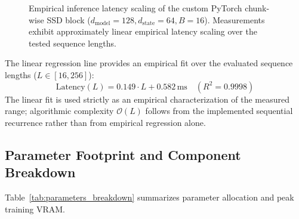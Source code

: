 \documentclass[pdflatex,sn-mathphys-num]{sn-jnl}%
\begin{document}
\begin{figure}[!htbp]
\centering
{}
\caption{Empirical inference latency scaling of the custom PyTorch chunk-wise SSD block ($d_{\text{model}}=128, d_{\text{state}}=64, B=16$). Measurements exhibit approximately linear empirical latency scaling over the tested sequence lengths.}
\label{fig:scaling}
\end{figure}

The linear regression line provides an empirical fit over the evaluated sequence lengths ($L \in [16, 256]$):
\begin{equation}
\text{Latency}(L) = 0.149 \cdot L + 0.582\,\text{ms} \quad (R^2 = 0.9998)
\end{equation}
The linear fit is used strictly as an empirical characterization of the measured range; algorithmic complexity $\mathcal{O}(L)$ follows from the implemented sequential recurrence rather than from empirical regression alone.

\subsection{Parameter Footprint and Component Breakdown}
Table~\ref{tab:parameters_breakdown} summarizes parameter allocation and peak training VRAM.
\end{document}
